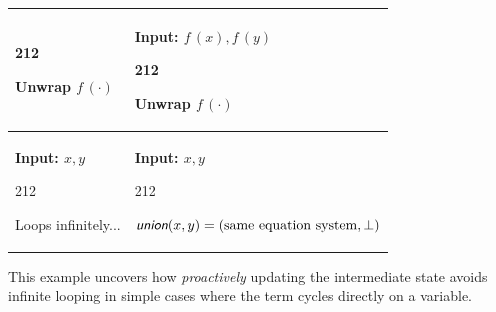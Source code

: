 \begin{center}
\begin{longtable}{p{4cm}|p{7cm}}
{            \begin{dinglist}{212}
                \item Unwrap $f\,(\cdot)$
            \end{dinglist}
        } & {
            \textbf{Input: $f\,(x), f\,(y)$}
            \begin{dinglist}{212}
                \item Unwrap $f\,(\cdot)$
            \end{dinglist}
        } \\\hline
        {
            \textbf{Input: $x, y$}
            \begin{dinglist}{212}
                \item Loops infinitely...
            \end{dinglist}
        } & {
            \textbf{Input: $x, y$}
            \begin{dinglist}{212}
                \item $\union(x, y) = (\text{same equation system}, \bot)$
            \end{dinglist}
        } \\
    \end{longtable}
\end{center}

This example uncovers how \textit{proactively} updating the intermediate state avoids infinite looping in simple cases where the term cycles directly on a variable.

